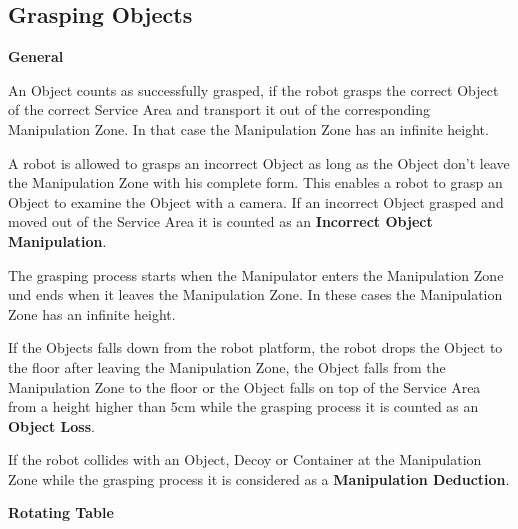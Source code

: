 




\subsection{Grasping Objects} \label{ssec:GraspingObjects}

\textbf{General}

An Object counts as successfully grasped, if the robot grasps the correct Object of the correct Service Area and transport it out of the corresponding Manipulation Zone. In that case the Manipulation Zone has an infinite height. 

A robot is allowed to grasps an incorrect Object as long as the Object don't leave the Manipulation Zone with his complete form. This enables a robot to grasp an Object to examine the Object with a camera. If an incorrect Object grasped and moved out of the Service Area it is counted as an \textbf{Incorrect Object Manipulation}.

The grasping process starts when the Manipulator enters the Manipulation Zone und ends when it leaves the Manipulation Zone. In these cases the Manipulation Zone has an infinite height.

If the Objects falls down from the robot platform, the robot drops the Object to the floor after leaving the Manipulation Zone, the Object falls from the Manipulation Zone to the floor or the Object falls on top of the Service Area from a height higher than $5\si{\centi\meter}$ while the grasping process it is counted as an \textbf{Object Loss}.

If the robot collides with an Object, Decoy or Container at the Manipulation Zone while the grasping process it is considered as a \textbf{Manipulation Deduction}.

\textbf{Rotating Table}

